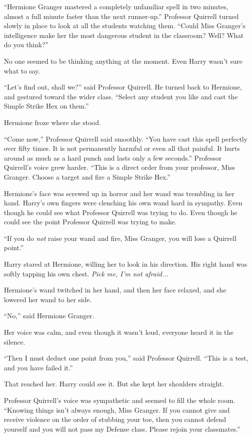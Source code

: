 “Hermione Granger mastered a completely unfamiliar spell in two minutes, almost a full minute faster than the next runner-up.” Professor Quirrell turned slowly in place to look at all the students watching them. “Could Miss Granger’s intelligence make her the most dangerous student in the classroom? Well? What do you think?”

No one seemed to be thinking anything at the moment. Even Harry wasn’t sure what to say.

“Let’s find out, shall we?” said Professor Quirrell. He turned back to Hermione, and gestured toward the wider class. “Select any student you like and cast the Simple Strike Hex on them.”

Hermione froze where she stood.

“Come now,” Professor Quirrell said smoothly. “You have cast this spell perfectly over fifty times. It is not permanently harmful or even all that painful. It hurts around as much as a hard punch and lasts only a few seconds.” Professor Quirrell’s voice grew harder. “This is a direct order from your professor, Miss Granger. Choose a target and fire a Simple Strike Hex.”

Hermione’s face was screwed up in horror and her wand was trembling in her hand. Harry’s own fingers were clenching his own wand hard in sympathy. Even though he could see what Professor Quirrell was trying to do. Even though he could see the point Professor Quirrell was trying to make.

“If you do \emph{not} raise your wand and fire, Miss Granger, you will lose a Quirrell point.”

Harry stared at Hermione, willing her to look in his direction. His right hand was softly tapping his own chest. \emph{Pick me, I’m not afraid...}

Hermione’s wand twitched in her hand, and then her face relaxed, and she lowered her wand to her side.

“No,” said Hermione Granger.

Her voice was calm, and even though it wasn’t loud, everyone heard it in the silence.

“Then I must deduct one point from you,” said Professor Quirrell. “This is a test, and you have failed it.”

That reached her. Harry could see it. But she kept her shoulders straight.

Professor Quirrell’s voice was sympathetic and seemed to fill the whole room. “Knowing things isn’t always enough, Miss Granger. If you cannot give and receive violence on the order of stubbing your toe, then you cannot defend yourself and you will not pass my Defense class. Please rejoin your classmates.”

